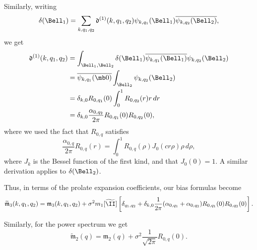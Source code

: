 \documentclass[9pt,twocolumn,twoside,lineno]{pnas-new}
\begin{document}
Similarly, writing
\[ \delta(\Bell_1) =
\sum_{k,q_1,q_2}\mathfrak{d}^{(1)}(k,q_1,q_2)
\psi_{k,q_1}(\Bell_1) \overline{\psi_{k,q_2}(\Bell_2)},\]
we get
\[\begin{aligned} 
\mathfrak{d}^{(1)}(k,q_1,q_2) &= \int_{\Bell_1,
	\Bell_2}\delta(\Bell_1)\overline{\psi_{k,q_1}(\Bell_1)}
\psi_{k,q_2}(\Bell_2)\\
&= \overline{\psi_{k,q_1}(\mb 0)}
\int_{\Bell_2}\psi_{k,q_2}(\Bell_2)\\
&= \delta_{k,0} R_{0,q_1}(0) \int_0^1R_{0,q_2}(r)r\, dr\\
&= \delta_{k,0} \frac{\alpha_{0,q_2}}{2\pi}R_{0,q_1}(0)R_{0,q_2}(0),
\end{aligned}\]
where we used the fact that $R_{0,q}$ satisfies
\[ \frac{\alpha_{0,q}}{2\pi}R_{0,q}(r) =
\int_0^1R_{0,q}(\rho)J_{0}(cr\rho)\rho\, d\rho,\]
where $J_k$ is the Bessel function of the first kind, and that
$J_0(0)=1$. 
A similar derivation applies to $\delta(\Bell_2)$. 

Thus, in terms of the prolate expansion coefficients, our bias
formulas become
\[ \widetilde{\mathfrak{m}}_3(k,q_1,q_2) = \mathfrak{m}_3(k,q_1,q_2) +
\sigma^2m_1[\widetilde \II]\left[\delta_{q_1,q_2} + \delta_{k,0}\frac{1}{2\pi}(\alpha_{0,q_1}+\alpha_{0,q_2})R_{0,q_1}(0)R_{0,q_2}(0)\right].\]

Similarly, for the power spectrum we get
\[ \widetilde{\mathfrak{m}}_2(q) = \mathfrak{m}_2(q) + \sigma^2\frac{1}{\sqrt{2\pi}}R_{0,q}(0).\]
\end{document}
